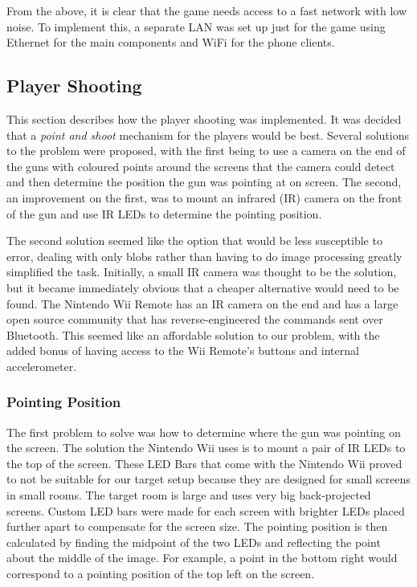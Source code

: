 \documentclass[a4paper,11pt]{article}
\begin{document}
From the above, it is clear that the game needs access to a fast network with low noise. To implement this, a separate LAN was set up just for the game using Ethernet for the main components and WiFi for the phone clients.

\subsection{Player Shooting}

This section describes how the player shooting was implemented. It was decided that a \emph{point and shoot} mechanism for the players would be best. Several solutions to the problem were proposed, with the first being to use a camera on the end of the guns with coloured points around the screens that the camera could detect and then determine the position the gun was pointing at on screen. The second, an improvement on the first, was to mount an infrared (IR) camera on the front of the gun and use IR LEDs to determine the pointing position. 

The second solution seemed like the option that would be less susceptible to error, dealing with only blobs rather than having to do image processing greatly simplified the task. Initially, a small IR camera was thought to be the solution, but it became immediately obvious that a cheaper alternative would need to be found. The Nintendo Wii Remote has an IR camera on the end and has a large open source community that has reverse-engineered the commands sent over Bluetooth\cite{wiibrew_wiimote}. This seemed like an affordable solution to our problem, with the added bonus of having access to the Wii Remote's buttons and internal accelerometer. 

\subsubsection{Pointing Position}
The first problem to solve was how to determine where the gun was pointing on the screen. The solution the Nintendo Wii uses is to mount a pair of IR LEDs to the top of the screen. These LED Bars that come with the Nintendo Wii proved to not be suitable for our target setup because they are designed for small screens in small rooms. The target room is large and uses very big back-projected screens. Custom LED bars were made for each screen with brighter LEDs placed further apart to compensate for the screen size. The pointing position is then calculated by finding the midpoint of the two LEDs and reflecting the point about the middle of the image. For example, a point in the bottom right would correspond to a pointing position of the top left on the screen.
\end{document}
